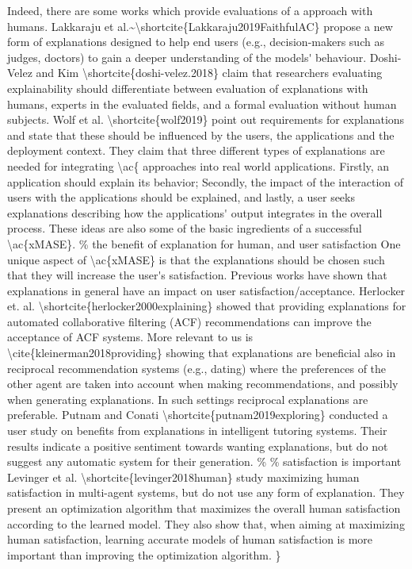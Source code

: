 \documentclass[letterpaper]{article} %
\begin{document}
{{{{{{{%
Indeed, there are some works which provide evaluations of a \ac{ approach with humans.
Lakkaraju et al.~\shortcite{Lakkaraju2019FaithfulAC} propose a new form of explanations designed to help end users (e.g., decision-makers such as judges, doctors) to gain a deeper understanding of the models' behaviour.
Doshi-Velez and Kim \shortcite{doshi-velez.2018} claim that researchers evaluating explainability should differentiate between evaluation of explanations with humans, experts in the evaluated fields, and a formal evaluation without human subjects.
Wolf et al. \shortcite{wolf2019} point out requirements for explanations and state that these should be influenced by the users, the applications and the deployment context.
They claim that three different types of explanations are needed for integrating \ac{ approaches into real world applications. Firstly, an application should explain its behavior; Secondly, the impact of the interaction of users with the  applications should be explained, and lastly, a user seeks explanations describing how the applications' output integrates in the overall process. These ideas are also some of the basic ingredients of a successful \ac{xMASE}.

One unique aspect of \ac{xMASE} is that the explanations should be chosen such that they will increase the user's satisfaction. Previous works have shown that explanations in general have an impact on user satisfaction/acceptance. Herlocker et. al. \shortcite{herlocker2000explaining} showed that providing explanations
for automated collaborative filtering (ACF) recommendations can improve the acceptance of ACF systems.
More relevant to us is \cite{kleinerman2018providing} showing that explanations are beneficial also in reciprocal recommendation systems (e.g., dating) where the preferences of the other agent are taken into account when making recommendations, and possibly when generating explanations. In such settings reciprocal explanations are preferable.
Putnam and Conati \shortcite{putnam2019exploring} conducted a user study on benefits from  explanations in intelligent tutoring systems. Their results indicate a positive sentiment towards wanting explanations, but do not suggest any automatic system for their generation.
%
Levinger et al. \shortcite{levinger2018human} study maximizing human satisfaction in multi-agent systems, but do not use any form of explanation. They present an optimization algorithm that maximizes the overall human satisfaction according to the learned model. They also show that, when aiming at maximizing human satisfaction, learning accurate models of human satisfaction is more important than improving the optimization algorithm.




}}}}}}}}}
\end{document}
